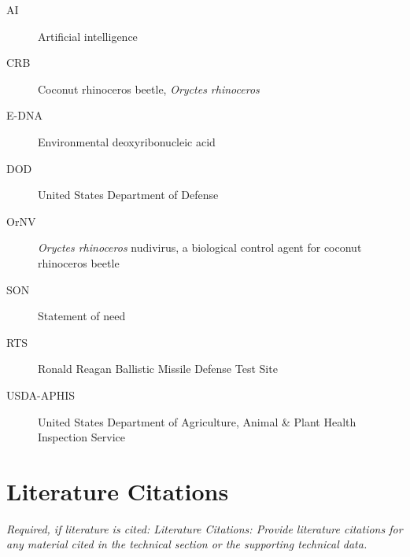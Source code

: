 \documentclass[11pt,english,letterpaper]{scrartcl}
\begin{document}
\begin{description}
	\item[AI] Artificial intelligence
	\item[CRB] Coconut rhinoceros beetle, \textit{Oryctes rhinoceros}
	\item[E-DNA] Environmental deoxyribonucleic acid
	\item[DOD] United States Department of Defense
	\item[OrNV] \textit{Oryctes rhinoceros} nudivirus, a biological control agent for coconut rhinoceros beetle
	\item[SON] Statement of need
	\item[RTS] Ronald Reagan Ballistic Missile Defense Test Site
	\item[USDA-APHIS] United States Department of Agriculture, Animal \& Plant Health Inspection Service
\end{description}

\clearpage

\section{Literature Citations}

\textit{Required, if literature is cited: Literature Citations: Provide literature citations for any material cited in the technical section or the supporting technical data.} \\
\end{document}
